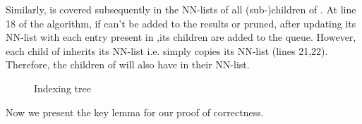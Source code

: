 \documentclass[prodmode,letterpaper]{acmsmall}
\begin{document}
Similarly,  is covered subsequently
in the NN-lists of all (sub-)children of .
At line 18 of the algorithm, if  can't be added to the results or pruned,
after updating its NN-list with each entry present in ,its children are added
to the queue. However, each child of  inherits its NN-list i.e. simply copies
its NN-list (lines 21,22). Therefore, the children of  will also have  in
their NN-list.


\begin{figure}[tp]
\begin{center}
\caption{\small Indexing tree \label{fig:proof}}
\end{center}
\end{figure}

Now we present the key lemma for our proof of correctness.
\end{document}
